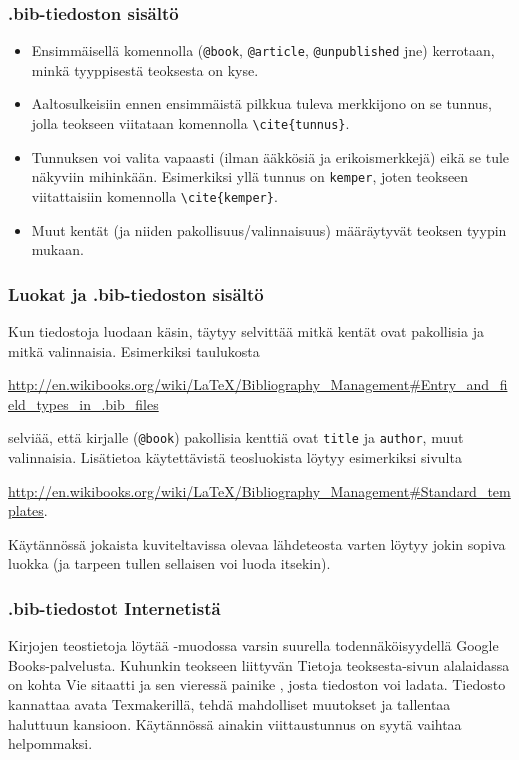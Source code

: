 \begin{frame}[fragile]
    \frametitle{.bib-tiedoston sisältö}
    \begin{itemize}
        \item Ensimmäisellä komennolla (\verb-@book-, \verb-@article-, \verb-@unpublished- jne) kerrotaan, minkä tyyppisestä teoksesta on kyse. 
        \item Aaltosulkeisiin ennen ensimmäistä pilkkua tuleva merkkijono on se tunnus, jolla teokseen viitataan komennolla \verb-\cite{tunnus}-. 
        \item Tunnuksen voi valita vapaasti (ilman ääkkösiä ja erikoismerkkejä) eikä se tule näkyviin mihinkään.  Esimerkiksi yllä tunnus on \verb-kemper-, joten teokseen viitattaisiin komennolla \verb-\cite{kemper}-.
        \item Muut kentät (ja niiden pakollisuus/valinnaisuus) määräytyvät teoksen tyypin mukaan.
    \end{itemize}
\end{frame}
\begin{frame}[fragile]
    \frametitle{Luokat ja .bib-tiedoston sisältö}
    Kun tiedostoja luodaan käsin, täytyy selvittää mitkä kentät ovat pakollisia ja mitkä valinnaisia. 
    \vaihto
    Esimerkiksi taulukosta 
    \begin{scriptsize}
        \url{http://en.wikibooks.org/wiki/LaTeX/Bibliography_Management#Entry_and_field_types_in_.bib_files}
    \end{scriptsize}
    selviää, että kirjalle (\verb-@book-) pakollisia kenttiä ovat \verb-title- ja \verb-author-, muut valinnaisia.
    \vaihto
    Lisätietoa käytettävistä teosluokista löytyy esimerkiksi sivulta
    \begin{scriptsize}
        \url{http://en.wikibooks.org/wiki/LaTeX/Bibliography_Management#Standard_templates}.
    \end{scriptsize}
    \vaihto
    Käytännössä jokaista kuviteltavissa olevaa lähdeteosta varten löytyy jokin sopiva luokka (ja tarpeen tullen sellaisen voi luoda itsekin).
\end{frame}
\begin{frame}[fragile]
    
\end{frame}
\begin{frame}[fragile]
    \frametitle{.bib-tiedostot Internetistä}
    Kirjojen teostietoja löytää \BibTeX -muodossa varsin suurella todennäköisyydellä Google Books-palvelusta. 
    \vaihto
    Kuhunkin teokseen liittyvän Tietoja teoksesta-sivun alalaidassa on kohta Vie sitaatti ja sen vieressä painike \BibTeX, josta tiedoston voi ladata.
    \vaihto
    Tiedosto kannattaa avata Texmakerillä, tehdä mahdolliset muutokset ja tallentaa haluttuun kansioon. 
    \vaihto
    Käytännössä ainakin viittaustunnus on syytä vaihtaa helpommaksi.
\end{frame}
